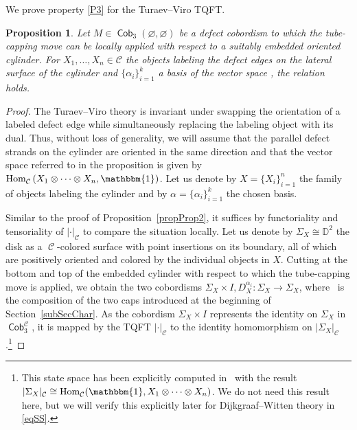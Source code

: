 \documentclass[10pt,a4paper]{amsart}
\DeclareMathOperator{\Hom}{Hom}
\DeclareMathOperator{\Cob}{\mathsf{Cob}}
\DeclareMathOperator{\calc}{\mathcal{C}}
\numberwithin{equation}{section}
\newtheorem{Proposition}[Proposition]{Proposition}
\theoremstyle{definition}
\begin{document}
We prove property \ref{P3} for the Turaev--Viro TQFT.
\begin{Proposition}
 \label{propProp3TV}
 Let $M \in \Cob_3(\varnothing, \varnothing)$ be a defect cobordism to which the tube-capping move can be locally applied with respect to a suitably embedded oriented cylinder. For $X_1, \dots, X_n \in \mathcal{C}$ the objects labeling the defect edges on the lateral surface of the cylinder and $\{\alpha_i\}_{i = 1}^k$ a basis of the vector space \smash{$\Hom_{\calc}\bigl(X_1^{\varepsilon(1)} \otimes \dots \otimes X_n^{\varepsilon(n)}, \mathbbm{1}\bigr) $}, the relation \smash{$|M|_{\calc} = \sum_{i = 1}^k|\Delta_3^{\alpha_i}(M)|_{\calc}$} holds.
\end{Proposition}
\begin{proof}
 The Turaev--Viro theory is invariant under swapping the orientation of a labeled defect edge while simultaneously replacing the labeling object with its dual. Thus, without loss of generality, we will assume that the parallel defect strands on the cylinder are oriented in the same direction and that the vector space referred to in the proposition is given by $\Hom_{\calc}\left(X_1 \otimes \dots \otimes X_n, \mathbbm{1}\right)$. Let us denote by $X = \{X_i\}_{i = 1}^n$ the family of objects labeling the cylinder and by $\alpha = \{\alpha_i\}_{i = 1}^k$ the chosen basis.

 Similar to the proof of Proposition~\ref{propProp2}, it suffices by functoriality and tensoriality of $|\cdot|_{\calc}$ to compare the situation locally. Let us denote by $\Sigma_X \cong \mathbb{D}^2$ the disk as a $\calc$-colored surface with point insertions on its boundary, all of which are positively oriented and colored by the individual objects in $X$. Cutting at the bottom and top of the embedded cylinder with respect to which the tube-capping move is applied, we obtain the two cobordisms $\Sigma_X \times I, D_X^{\alpha_i}\colon \Sigma_X \rightarrow \Sigma_X$, where~ is the composition  of the two caps introduced at the beginning of Section~\ref{subSecChar}.
 As the cobordism $\Sigma_X \times I$ represents the identity on $\Sigma_X$ in $\Cob_3^{\calc}$, it is mapped by the TQFT $|\cdot |_{\calc}$ to the identity homomorphism on $|\Sigma_X|_{\calc}$.\footnote{This state space has been explicitly computed in~\cite{F} with the result $|\Sigma_X|_{\calc} \cong \Hom_{\calc} (\mathbbm{1}, X_1 \otimes \dots \otimes X_n )$. We do not need this result here, but we will verify this explicitly later for Dijkgraaf--Witten theory in \eqref{eqSS}.}


\end{proof}
\end{document}
